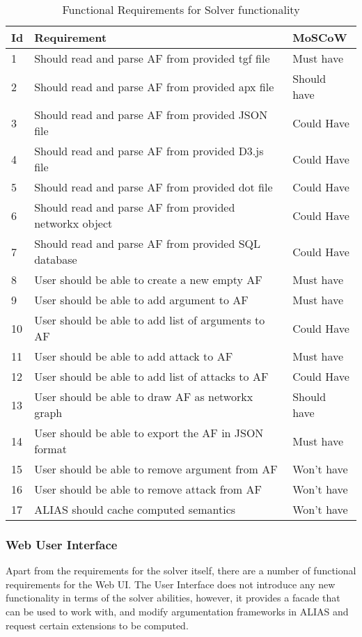 	\begin{longtable}{|p{0.5cm}|p{10cm}|p{2.5cm}|}
		\caption{Functional Requirements for Solver functionality}
		\label{table:functReqFunctionality}\\
		\hline
		\textbf{Id} & \textbf{Requirement} & \textbf{MoSCoW}  \\ \hline \hline
		1 & Should read and parse AF from provided tgf file & Must have \\ \hline
		2 & Should read and parse AF from provided apx file & Should have \\ \hline
		3 & Should read and parse AF from provided JSON file & Could Have \\ \hline
		4 & Should read and parse AF from provided D3.js file & Could Have \\ \hline
		5 & Should read and parse AF from provided dot file & Could Have \\ \hline
		6 & Should read and parse AF from provided networkx object & Could Have \\ \hline
		7 & Should read and parse AF from provided SQL database & Could Have \\ \hline
		8 & User should be able to create a new empty AF & Must have \\ \hline
		9 & User should be able to add argument to AF & Must have \\ \hline
		10 & User should be able to add list of arguments to AF & Could Have \\ \hline
		11 & User should be able to add attack to AF & Must have \\ \hline
		12 & User should be able to add list of attacks to AF & Could Have \\ \hline
		13 & User should be able to draw AF as networkx graph & Should have \\ \hline
		14 & User should be able to export the AF in JSON format & Must have \\ \hline
		15 & User should be able to remove argument from AF & Won't have \\ \hline
		16 & User should be able to remove attack from AF & Won't have \\ \hline
		17 & ALIAS should cache computed semantics & Won't have \\ \hline
	\end{longtable}%

\subsubsection{Web User Interface} \label{section:WebUIRequirements}
Apart from the requirements for the solver itself, there are a number of functional requirements for the Web UI. The User Interface does not introduce any new functionality in terms of the solver abilities, however, it provides a facade that can be used to work with, and modify argumentation frameworks in ALIAS and request certain extensions to be computed. 

